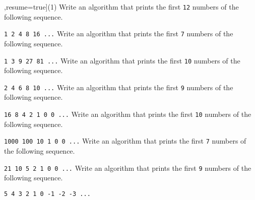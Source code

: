 \begin{exercise}
    \begin{longtasks}[counter-format=7.tsk[1],resume=true](1)
        \task
        Write an algorithm that prints the first \texttt{12} numbers of the following sequence.

        \texttt{1 2 4 8 16 ...}
        \task
        Write an algorithm that prints the first \texttt{7} numbers of the following sequence.

        \texttt{1 3 9 27 81 ...}
        \task
        Write an algorithm that prints the first \texttt{10} numbers of the following sequence.

        \texttt{2 4 6 8 10 ...}
        \task
        Write an algorithm that prints the first \texttt{9} numbers of the following sequence.

        \texttt{16 8 4 2 1 0 0 ...}
        \task
        Write an algorithm that prints the first \texttt{10} numbers of the following sequence.

        \texttt{1000 100 10 1 0 0 ...}
        \task
        Write an algorithm that prints the first \texttt{7} numbers of the following sequence.

        \texttt{21 10 5 2 1 0 0 ...}
        \task
        Write an algorithm that prints the first \texttt{9} numbers of the following sequence.

        \texttt{5 4 3 2 1 0 -1 -2 -3 ...}
    \end{longtasks}
\end{exercise}
